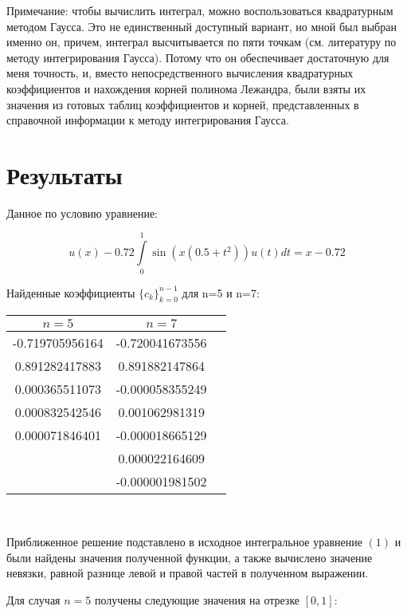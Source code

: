 \documentclass[12pt,a4paper]{article}
\begin{document}
Примечание: чтобы вычислить интеграл, можно воспользоваться квадратурным методом Гаусса. Это не единственный доступный вариант, но мной был выбран именно он, причем, интеграл высчитывается по пяти точкам (см. литературу по методу интегрирования Гаусса). Потому что он обеспечивает достаточную для меня точность, и, вместо непосредственного вычисления квадратурных коэффициентов и нахождения корней полинома Лежандра, были взяты их значения из готовых таблиц коэффициентов и корней, представленных в справочной информации к методу интегрирования Гаусса.


\section{Результаты}

Данное по условию уравнение:

$$
 u(x) - 0.72 \int\limits_0^1 \sin (x(0.5+t^2)) u(t) dt = x - 0.72
$$

Найденные коэффициенты $\{ c_k \}_{k=0}^{n-1}$ для n=5 и n=7:

\begin{center}
\begin{tabular}{ccc}
$n=5$ & $n=7$ \\
\hline
-0.719705956164 & -0.720041673556 \\
 0.891282417883 &  0.891882147864 \\
 0.000365511073 & -0.000058355249 \\
 0.000832542546 &  0.001062981319 \\
 0.000071846401 & -0.000018665129 \\
                &  0.000022164609 \\
                & -0.000001981502 \\
\end{tabular}
\end{center}

\

Приближенное решение подставлено в исходное интегральное уравнение $(1)$ и были найдены значения полученной функции, а также вычислено значение невязки, равной разнице левой и правой частей в полученном выражении.

Для случая $n=5$ получены следующие значения на отрезке $[0,1]$:
\end{document}
